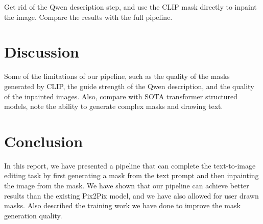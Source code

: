 \documentclass{article}
\begin{document}
Get rid of the Qwen description step, and use the CLIP mask directly to inpaint the image. Compare the results with the full pipeline.


\section{Discussion}


Some of the limitations of our pipeline, such as the quality of the masks generated by CLIP, the guide strength of the Qwen description, and the quality of the inpainted images. Also, compare with SOTA transformer structured models, note the ability to generate complex masks and drawing text.


\section{Conclusion}


In this report, we have presented a pipeline that can complete the text-to-image editing task by first generating a mask from the text prompt and then inpainting the image from the mask. We have shown that our pipeline can achieve better results than the existing Pix2Pix model, and we have also allowed for user drawn masks. Also described the training work we have done to improve the mask generation quality.
\end{document}
